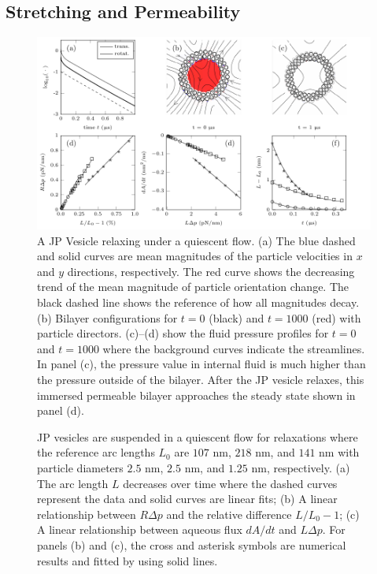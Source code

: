 \documentclass[lineno]{jfm}
\begin{document}
\subsection{Stretching and Permeability}
\begin{figure}
\centering
\includegraphics[width=\textwidth]{Figure2_Wrapper.pdf}
\caption{\label{figure2} A JP Vesicle relaxing under a quiescent flow.
  (a) The blue dashed and solid curves are mean magnitudes of the
  particle velocities in $x$ and $y$ directions, respectively. The red
  curve shows the decreasing trend of the mean magnitude of particle
  orientation change. The black dashed line shows the reference of how
  all magnitudes decay. (b) Bilayer configurations for $t=0$ (black) and
  $t=1000$ (red) with particle directors. (c)--(d) show the fluid
  pressure profiles for $t=0$ and $t=1000$ where the background curves
  indicate the streamlines. In panel (c), the pressure value in internal
  fluid is much higher than the pressure outside of the bilayer. After
  the JP vesicle relaxes, this immersed permeable bilayer approaches the
  steady state shown in panel (d).}
\end{figure}

\begin{figure}
  \caption{\label{figure:permeability} JP vesicles are suspended in a
  quiescent flow for relaxations where the reference arc lengths $L_0$
  are $107$ nm, $218$ nm, and $141$ nm with particle diameters $2.5$ nm,
  $2.5$ nm, and $1.25$ nm, respectively. (a) The arc length $L$
  decreases over time where the dashed curves represent the data and
  solid curves are linear fits; (b) A linear relationship between
  $R\Delta p$ and the relative difference $L/L_0-1$; (c) A linear
  relationship between aqueous flux $dA/dt$ and $L\Delta p$. For panels
  (b) and (c), the cross and asterisk symbols are numerical results and
  fitted by using solid lines.}
\end{figure}
\end{document}
